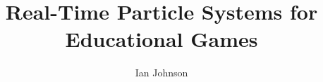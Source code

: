 \documentclass[11pt]{fsuthesis}
\title{Real-Time Particle Systems for Educational Games}
\author{Ian Johnson}
\begin{document}
\frontmatter
\maketitle
\makesignaturepage



\tableofcontents



\begin{abstract}
\end{abstract}

\mainmatter










%


%

%



\begin{biosketch}
\end{biosketch}
\end{document}

